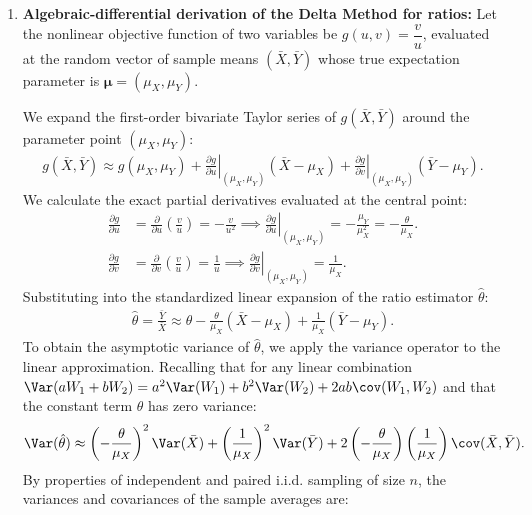 \begin{solproblema}
	\begin{enumerate}
		\item \textbf{Algebraic-differential derivation of the Delta Method for ratios:}
		Let the nonlinear objective function of two variables be $g(u, v) = \dfrac{v}{u}$, evaluated at the random vector of sample means $(\bar{X}, \bar{Y})$ whose true expectation parameter is $\boldsymbol{\mu} = (\mu_X, \mu_Y)$.
		
		We expand the first-order bivariate Taylor series of $g(\bar{X}, \bar{Y})$ around the parameter point $(\mu_X, \mu_Y)$:
		\begin{align}
			g(\bar{X}, \bar{Y}) \approx g(\mu_X, \mu_Y) + \left. \frac{\partial g}{\partial u} \right|_{(\mu_X, \mu_Y)} (\bar{X} - \mu_X) + \left. \frac{\partial g}{\partial v} \right|_{(\mu_X, \mu_Y)} (\bar{Y} - \mu_Y).
		\end{align}
		We calculate the exact partial derivatives evaluated at the central point:
		\begin{align}
			\frac{\partial g}{\partial u} &= \frac{\partial}{\partial u}\left( \frac{v}{u} \right) = -\frac{v}{u^2} \implies \left. \frac{\partial g}{\partial u} \right|_{(\mu_X, \mu_Y)} = -\frac{\mu_Y}{\mu_X^2} = -\frac{\theta}{\mu_X}. \\
			\frac{\partial g}{\partial v} &= \frac{\partial}{\partial v}\left( \frac{v}{u} \right) = \frac{1}{u} \implies \left. \frac{\partial g}{\partial v} \right|_{(\mu_X, \mu_Y)} = \frac{1}{\mu_X}.
		\end{align}
		Substituting into the standardized linear expansion of the ratio estimator $\hat{\theta}$:
		\begin{align}
			\hat{\theta} = \frac{\bar{Y}}{\bar{X}} \approx \theta - \frac{\theta}{\mu_X}(\bar{X} - \mu_X) + \frac{1}{\mu_X}(\bar{Y} - \mu_Y).
		\end{align}
		To obtain the asymptotic variance of $\hat{\theta}$, we apply the variance operator to the linear approximation. Recalling that for any linear combination $\Var(aW_1 + bW_2) = a^2\Var(W_1) + b^2\Var(W_2) + 2ab\cov(W_1, W_2)$ and that the constant term $\theta$ has zero variance:
		\begin{align}
			\Var(\hat{\theta}) \approx \left( -\frac{\theta}{\mu_X} \right)^2 \Var(\bar{X}) + \left( \frac{1}{\mu_X} \right)^2 \Var(\bar{Y}) + 2\left( -\frac{\theta}{\mu_X} \right)\left( \frac{1}{\mu_X} \right) \cov(\bar{X}, \bar{Y}).
		\end{align}
		By properties of independent and paired i.i.d. sampling of size $n$, the variances and covariances of the sample averages are:

\end{enumerate}
\end{solproblema}
